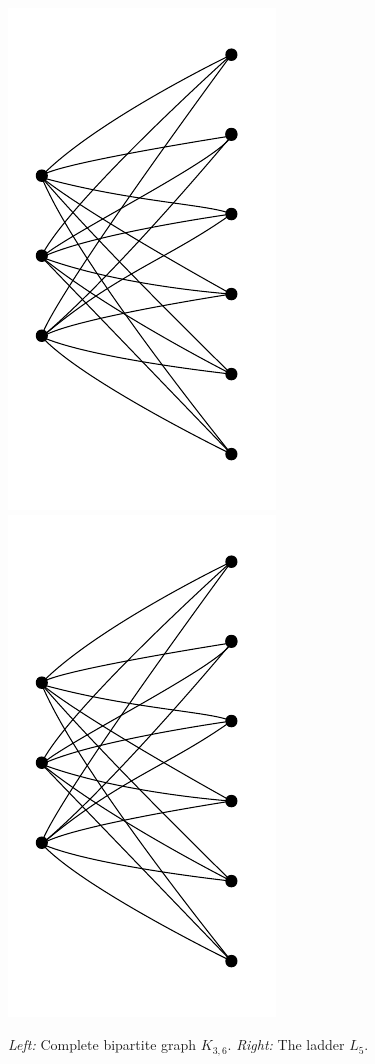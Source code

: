 \begin{figure}[h]
  \centering
    \includegraphics[scale=0.45,page=1]{pictures.pdf}\hspace{2cm}
	    \includegraphics[scale=0.45,page=2]{pictures.pdf}
  \caption{\emph{Left:} Complete bipartite graph $K_{3,6}$. \emph{Right:} The ladder $L_5$.}
  \label{fig:bipartite}
\end{figure}

